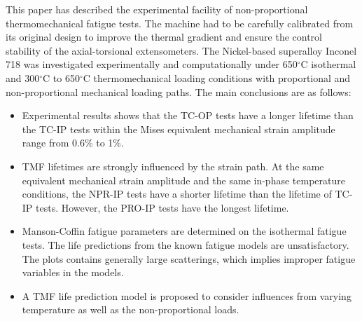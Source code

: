 \documentclass[preprint,5p,twocolumn,11pt,sort&compress]{elsarticle}
\begin{document}
This paper has described the experimental facility of non-proportional thermomechanical fatigue tests. The machine had to be carefully calibrated from its original design to improve the thermal gradient and ensure the control stability of the axial-torsional extensometers. The Nickel-based superalloy Inconel 718 was investigated experimentally and computationally under 650$^\circ$C isothermal and 300$^\circ$C to 650$^\circ$C thermomechanical loading conditions with proportional and non-proportional mechanical loading paths. The main conclusions are as follows:

\begin{itemize}
\item Experimental results shows that the TC-OP tests have a longer lifetime than the TC-IP tests within the Mises equivalent mechanical strain amplitude range from 0.6\% to 1\%.

\item TMF lifetimes are strongly influenced by the strain path. At the same equivalent mechanical strain amplitude and the same in-phase temperature conditions, the NPR-IP tests have a shorter lifetime than the lifetime of TC-IP tests. However, the PRO-IP tests have the longest lifetime.

\item Manson-Coffin fatigue parameters are determined on the isothermal fatigue tests. The life predictions from the known fatigue models are unsatisfactory. The plots contains generally large scatterings, which implies improper fatigue variables in the models.

\item A TMF life prediction model is proposed to consider influences from varying temperature as well as the non-proportional loads.
\end{itemize}



\end{document}
